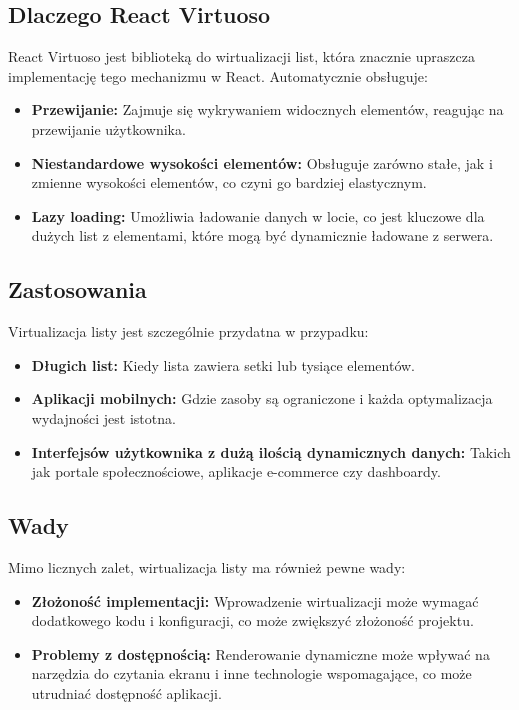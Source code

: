 \subsection*{Dlaczego React Virtuoso}
React Virtuoso jest biblioteką do wirtualizacji list, która znacznie upraszcza implementację tego mechanizmu w React. Automatycznie obsługuje:
\begin{itemize}
    \item \textbf{Przewijanie:} Zajmuje się wykrywaniem widocznych elementów, reagując na przewijanie użytkownika.
    \item \textbf{Niestandardowe wysokości elementów:} Obsługuje zarówno stałe, jak i zmienne wysokości elementów, co czyni go bardziej elastycznym.
    \item \textbf{Lazy loading:} Umożliwia ładowanie danych w locie, co jest kluczowe dla dużych list z elementami, które mogą być dynamicznie ładowane z serwera.
\end{itemize}

\subsection*{Zastosowania}
Virtualizacja listy jest szczególnie przydatna w przypadku:
\begin{itemize}
    \item \textbf{Długich list:} Kiedy lista zawiera setki lub tysiące elementów.
    \item \textbf{Aplikacji mobilnych:} Gdzie zasoby są ograniczone i każda optymalizacja wydajności jest istotna.
    \item \textbf{Interfejsów użytkownika z dużą ilością dynamicznych danych:} Takich jak portale społecznościowe, aplikacje e-commerce czy dashboardy.
\end{itemize}

\subsection*{Wady}
Mimo licznych zalet, wirtualizacja listy ma również pewne wady:
\begin{itemize}
    \item \textbf{Złożoność implementacji:} Wprowadzenie wirtualizacji może wymagać dodatkowego kodu i konfiguracji, co może zwiększyć złożoność projektu.
    \item \textbf{Problemy z dostępnością:} Renderowanie dynamiczne może wpływać na narzędzia do czytania ekranu i inne technologie wspomagające, co może utrudniać dostępność aplikacji.
\end{itemize}

